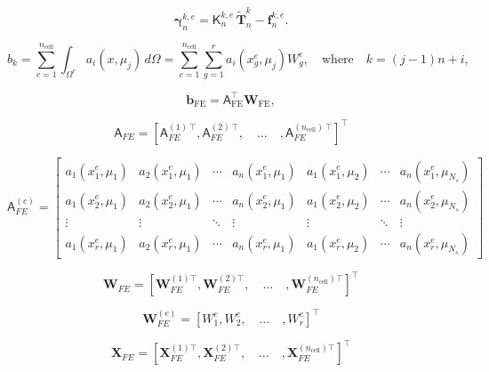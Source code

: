 \documentclass[11pt]{article}
\renewcommand{\vec}[1]{\mathbf{#1}}
\newcommand{\mat}[1]{\mathsf{#1}}
\begin{document}
\begin{equation}
    \boldsymbol{\gamma}^{k,e}_{n} = \mat{K}^{k,e}_n \,\widetilde{\vec{T}}^k_n - \vec{f}^{k,e}_n.
    \label{eq:gamma_n_exampleP}
\end{equation}

\begin{equation}
b_k = \sum_{e=1}^{n_{\text{cell}}} \int_{\Omega^e} a_i(x, \mu_j) \, d\Omega = \sum_{e=1}^{n_{\text{cell}}} \sum_{g=1}^{r} a_i(x_g^e, \mu_j) W_g^e, \quad \text{where} \quad k = (j-1)n + i,
\end{equation}

\begin{equation}
\mathbf{b}_{\text{FE}} = \mat{A}_{\text{FE}}^\top \mathbf{W}_{\text{FE}},
\end{equation}

\begin{equation}
\mat{A}_{FE} = \left[ 
\mat{A}_{FE}^{(1)\,\top}, 
\mat{A}_{FE}^{(2)\,\top},\quad
\hdots\quad
,\mat{A}_{FE}^{(n_{\text{cell}})\,\top} 
\right]^\top
\end{equation}

\begin{equation}
\mat{A}_{FE}^{(e)} = 
\begin{bmatrix} 
a_1(x_1^e, \mu_1) & a_2(x_1^e, \mu_1) & \cdots & a_n(x_1^e, \mu_1) & a_1(x_1^e, \mu_2) & \cdots & a_n(x_1^e, \mu_{N_s})\\ 
a_1(x_2^e, \mu_1) & a_2(x_2^e, \mu_1) & \cdots & a_n(x_2^e, \mu_1) & a_1(x_2^e, \mu_2) & \cdots & a_n(x_2^e, \mu_{N_s})\\ 
\vdots & \vdots & \ddots & \vdots & \vdots & \ddots & \vdots \\ 
a_1(x_r^e, \mu_1) & a_2(x_r^e, \mu_1) & \cdots & a_n(x_r^e, \mu_1) & a_1(x_r^e, \mu_2)  & \cdots & a_n(x_r^e, \mu_{N_s}) 
\end{bmatrix}
\end{equation}

\begin{equation}
\mathbf{W}_{FE} = \left[\vec{W}_{FE}^{(1)\top},
\vec{W}_{FE}^{(2)\top},\quad
\hdots\quad
,\vec{W}_{FE}^{(n_{\text{cell}})\top}\right]^\top
\label{eq:gaussian_weights}
\end{equation}

\begin{equation}
\vec{W}_{FE}^{(e)} = \left[ W_1^e, W_2^e, \quad\hdots\quad, W_r^e \right]^\top
\end{equation}

\begin{equation}
\mathbf{X}_{FE} = \left[\vec{X}_{FE}^{(1)\top}, 
\vec{X}_{FE}^{(2)\top},\quad
\hdots\quad
,\vec{X}_{FE}^{(n_{\text{cell}})\top}\right]^\top
\label{eq:X_points}
\end{equation}
\end{document}

